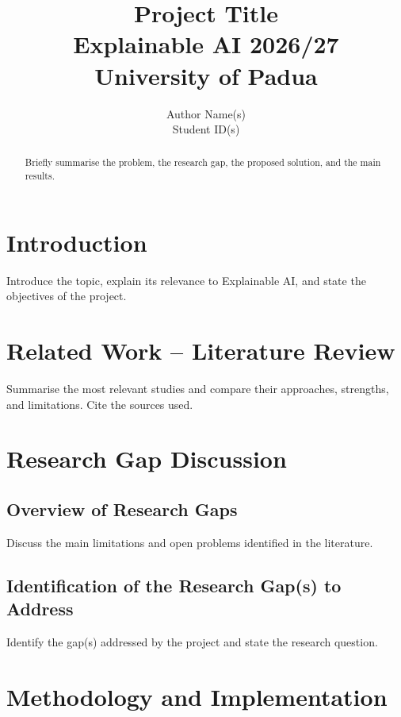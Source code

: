 \documentclass[10pt]{article}
\begin{document}
\title{Project Title\\
\large Explainable AI 2026/27\\
University of Padua}
\author{Author Name(s)\\Student ID(s)}
\date{}

\maketitle

\begin{abstract}
Briefly summarise the problem, the research gap, the proposed solution,
and the main results.
\end{abstract}



\section{Introduction}
Introduce the topic, explain its relevance to Explainable AI, and state
 the objectives of the project.

\section{Related Work -- Literature Review}
Summarise the most relevant studies and compare their approaches,
strengths, and limitations. Cite the sources used.

\section{Research Gap Discussion}

\subsection{Overview of Research Gaps}
Discuss the main limitations and open problems identified in the literature.

\subsection{Identification of the Research Gap(s) to Address}
Identify the gap(s) addressed by the project and state the research question.

\section{Methodology and Implementation}
\end{document}
